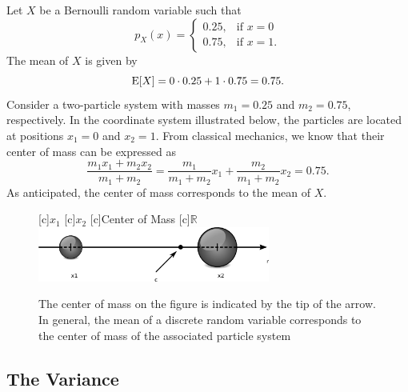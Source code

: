 \begin{example}
Let $X$ be a Bernoulli random variable such that
\begin{equation*}
p_X (x) = \left\{ \begin{array}{ll}
0.25, & \text{if }x = 0 \\
0.75, & \text{if }x = 1.
\end{array} \right.
\end{equation*}
The mean of $X$ is given by
\begin{equation*}
\mathrm{E} [X] = 0 \cdot 0.25 + 1 \cdot 0.75 = 0.75 .
\end{equation*}
Consider a two-particle system with masses $m_1 = 0.25$ and $m_2 = 0.75$, respectively.
In the coordinate system illustrated below, the particles are located at positions $x_1 = 0$ and $x_2 = 1$.
From classical mechanics, we know that their center of mass can be expressed as
\begin{equation*}
\frac{ m_1 x_1 + m_2 x_2 }{ m_1 + m_2 }
 = \frac{ m_1 }{ m_1 + m_2 } x_1 + \frac{ m_2 }{ m_1 + m_2 } x_2
 = 0.75 .
\end{equation*}
As anticipated, the center of mass corresponds to the mean of $X$.

\begin{figure}[ht]
\begin{center}
\begin{psfrags}
[c]{$x_1$}
[c]{$x_2$}
[c]{Center of Mass}
[c]{$\mathbb{R}$}
\includegraphics[height=1.8cm]{Figures/6Chapter/mass}
\end{psfrags}
\end{center}
\caption{The center of mass on the figure is indicated by the tip of the arrow.
In general, the mean of a discrete random variable corresponds to the center of mass of the associated particle system}
\end{figure}
\end{example}


\subsection{The Variance}

